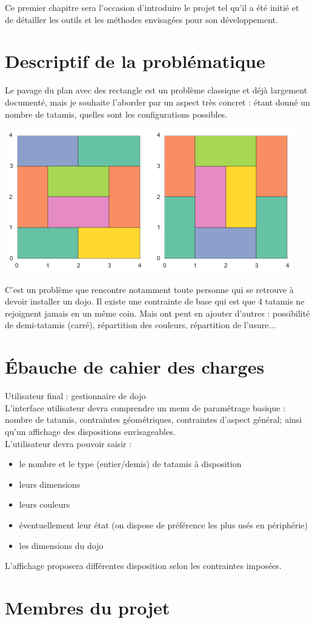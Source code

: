 \begin{summary}
    Ce premier chapitre sera l'occasion d'introduire le projet tel qu'il a été initié et de 
    détailler les outils et les méthodes envisagées pour son développement.
  \end{summary}

\section{Descriptif de la problématique}


Le pavage du plan avec des rectangle est un problème classique et déjà largement documenté,
mais je souhaite l'aborder par un aspect très concret : étant donné un nombre de tatamis, quelles sont les
configurations possibles.\\
\begin{center}
    \includegraphics[width = 0.5\linewidth]{./images/pavage-par-tatamis.png}
\end{center}
C'est un problème que rencontre notamment toute personne qui se retrouve à devoir installer un dojo.
Il existe une contrainte de base qui est que 4 tatamis ne rejoignent jamais en un même coin. Mais ont peut
en ajouter d'autres : possibilité de demi-tatamis (carré), répartition des couleurs, répartition de l'usure...

\section{Ébauche de cahier des charges}

Utilisateur final : gestionnaire de dojo\\

L'interface utilisateur devra comprendre un menu de paramétrage basique : nombre de tatamis,
contraintes géométriques, contraintes d'aspect général; ainsi qu'un affichage des dispositions envisageables.\\

L'utilisateur devra pouvoir saisir :

\begin{itemize}
    \item le nombre et le type (entier/demis) de tatamis à disposition
    \item leurs dimensions
    \item leurs couleurs
    \item éventuellement leur état (on dispose de préférence les plus usés en périphérie)
    \item les dimensions du dojo
\end{itemize}

L'affichage proposera différentes disposition selon les contraintes imposées.

\section{Membres du projet}
